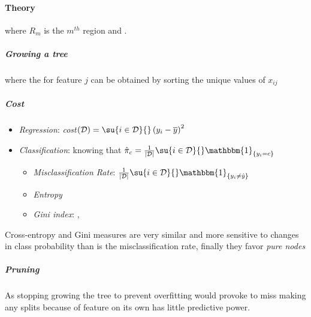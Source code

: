 \paragraph{Theory}
\begin{center}
\end{center}
where $R_{m}$ is the $m^{th}$ region  and 
.
\subparagraph{Growing a tree}
\begin{center}
\end{center}
where the  for feature $j$ can be obtained
by sorting the unique values of $x_{ij}$
\subparagraph{Cost}
\begin{itemize}
    \item \emph{Regression}: \emph{cost}$(\mathcal{D})=\su{i\in\mathcal{D}}{}\left(
        y_{i}-\overline{y}\right)^{2}$
    \item \emph{Classification}:  knowing that $\hat{\pi}_{c} = \frac{1}{|\mathcal{D}|}
        \su{i\in\mathcal{D}}{}\mathbbm{1}_{\{y_{i}=c\}}$ 
        \begin{itemize}
            \item \emph{Misclassification Rate}: $\frac{1}{|\mathcal{D}|}\su{i\in
                \mathcal{D}}{}\mathbbm{1}_{\{y_{i}\neq\hat{y}\}}$
            \item \emph{Entropy} 
            \item \emph{Gini index}: , 
        \end{itemize}
\end{itemize}
Cross-entropy and Gini measures are very similar and more sensitive to changes in class
probability than is the misclassification rate, finally they favor \emph{pure nodes}
\subparagraph{Pruning}
As stopping growing the tree to prevent overfitting would provoke to miss making any
splits because of feature on its own has little predictive power.\\
